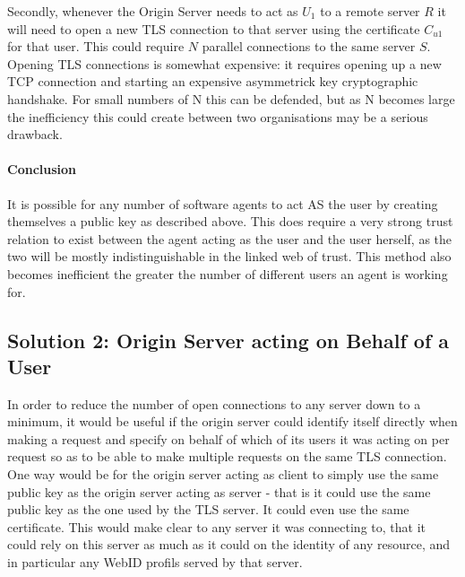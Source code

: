 \documentclass[a4paper]{llncs}
\begin{document}


Secondly, whenever the Origin Server needs to act as $U_1$ to a remote server $R$ it will need to open a new TLS connection to that server using the certificate $C_{u1}$ for that user.
This could require $N$ parallel connections to the same server $S$. 
Opening TLS connections is somewhat expensive: it requires opening up a new TCP connection and starting an expensive asymmetrick key cryptographic handshake. 
For small numbers of N this can be defended, but as N becomes large the inefficiency this could create between two
organisations may be a serious drawback.
 
\paragraph{Conclusion}

It is possible for any number of software agents to act AS the user by creating themselves a public key as described above.
This does require a very strong trust relation to exist between the agent acting as the user and the user herself, as the two will be mostly indistinguishable in the linked web of trust. 
This method also becomes inefficient the greater the number of different users  an agent is working for.

 
\subsection{Solution 2: Origin Server acting on Behalf of a User}

In order to reduce the number of open connections to any server down to a minimum, it would be useful if the origin server could identify itself directly when making a request and specify on behalf of which of its users it was acting on per request so as to be able to make multiple requests on the same TLS connection.
One way would be for the origin server acting as client to simply use the same public key as the origin server acting as server - that is it could use the same public key as the one used by the TLS server.
It could even use the same certificate.
This would make clear to any server it was connecting to, that it could rely on this server as much as it could on the identity of any resource, and in particular any WebID profils served by that server.
\end{document}
